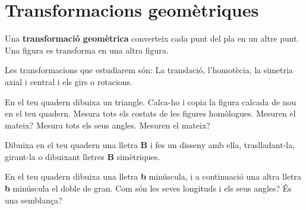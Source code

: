 \section{Transformacions geomètriques}


\begin{theorybox}
	Una \textbf{transformació geomètrica} converteix cada punt del pla en un altre punt. Una figura es transforma en una altra figura.
	
	Les transformacions que estudiarem són: La translació, l'homotècia, la simetria axial i central i els girs o rotacions.
\end{theorybox}

\begin{mylist}
\exer  En el teu quadern dibuixa un triangle. Calca-ho i copia la figura calcada de nou en el teu quadern. Mesura tots els costats de les figures homòlogues. Mesuren el mateix? Mesura tots els seus angles. Mesuren el mateix?


\exer  Dibuixa en el teu quadern una lletra \textbf{B} i fes un disseny amb ella, traslladant-la, girant-la o dibuixant lletres \textbf{B} simètriques.


\exer  En el teu quadern dibuixa una lletra \textbf{b} minúscula, i a continuació una altra lletra \textbf{b} minúscula el doble de gran. Com són les seves longituds i els seus angles? És una semblança?



\end{mylist}

